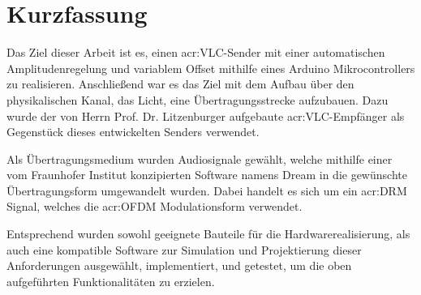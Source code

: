 

\chapter*{Kurzfassung}
\label{sec:abstract}

Das Ziel dieser Arbeit ist es, einen \gls{acr:VLC}-Sender mit einer automatischen Amplitudenregelung und variablem Offset mithilfe eines Arduino Mikrocontrollers zu realisieren. Anschließend war es das Ziel mit dem Aufbau über den physikalischen Kanal, das Licht, eine Übertragungsstrecke aufzubauen. Dazu wurde der von Herrn Prof. Dr. Litzenburger aufgebaute \gls{acr:VLC}-Empfänger als Gegenstück dieses entwickelten Senders verwendet.

Als Übertragungsmedium wurden Audiosignale gewählt, welche mithilfe einer vom Fraunhofer Institut konzipierten Software namens Dream in die gewünschte Übertragungsform umgewandelt wurden. Dabei handelt es sich um ein \gls{acr:DRM} Signal, welches die \gls{acr:OFDM} Modulationsform verwendet.

Entsprechend wurden sowohl geeignete Bauteile für die Hardwarerealisierung, als auch eine kompatible Software zur Simulation und Projektierung dieser Anforderungen ausgewählt, implementiert, und getestet, um die oben aufgeführten Funktionalitäten zu erzielen.